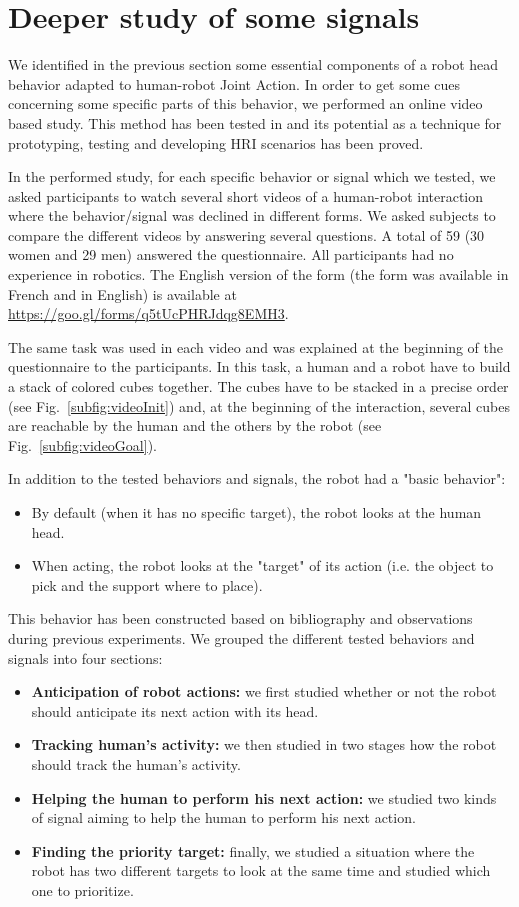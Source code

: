 \documentclass[english,a4paper,11pt,twoside]{StyleThese}
\begin{document}
\section{Deeper study of some signals}

We identified in the previous section some essential components of a robot head behavior adapted to human-robot Joint Action. In order to get some cues concerning some specific parts of this behavior, we performed an online video based study. This method has been tested in \cite{woods2006comparing} and its potential as a technique for prototyping, testing and developing HRI scenarios has been proved.

In the performed study, for each specific behavior or signal which we tested, we asked participants to watch several short videos of a human-robot interaction where the behavior/signal was declined in different forms. We asked subjects to compare the different videos by answering several questions. A total of 59 (30 women and 29 men) answered the questionnaire. All participants had no experience in robotics. The English version of the form (the form was available in French and in English) is available at \url{https://goo.gl/forms/q5tUcPHRJdqg8EMH3}.

The same task was used in each video and was explained at the beginning of the questionnaire to the participants. In this task, a human and a robot have to build a stack of colored cubes together. The cubes have to be stacked in a precise order (see Fig.~\ref{subfig:videoInit}) and, at the beginning of the interaction, several cubes are reachable by the human and the others by the robot (see Fig.~\ref{subfig:videoGoal}). 

In addition to the tested behaviors and signals, the robot had a "basic behavior":
\begin{itemize}
\item By default (when it has no specific target), the robot looks at the human head. 
\item When acting, the robot looks at the "target" of its action (i.e. the object to pick and the support where to place).
\end{itemize}
This behavior has been constructed based on bibliography and observations during previous experiments.
\newpage
We grouped the different tested behaviors and signals into four sections:
\begin{itemize}
\item \textbf{Anticipation of robot actions:} we first studied whether or not the robot should anticipate its next action with its head.
\item \textbf{Tracking human's activity:} we then studied in two stages how the robot should track the human's activity.
\item \textbf{Helping the human to perform his next action:} we studied two kinds of signal aiming to help the human to perform his next action.
\item \textbf{Finding the priority target:} finally, we studied a situation where the robot has two different targets to look at the same time and studied which one to prioritize.
\end{itemize}
\end{document}
